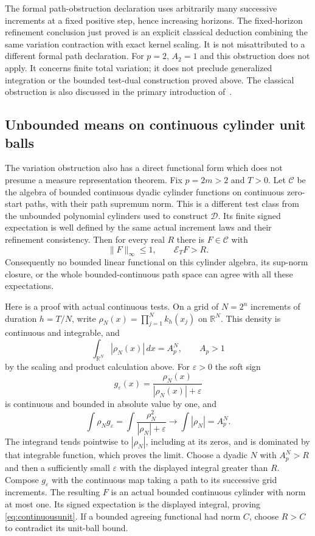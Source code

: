 \documentclass[11pt]{article}
\theoremstyle{remark}\newtheorem{remark}[theorem]{Remark}
\newcommand{\R}{\mathbb R}\newcommand{\N}{\mathbb N}
\newcommand{\D}{\mathcal D}\newcommand{\E}{\mathcal E}
\begin{document}
The formal path-obstruction declaration uses arbitrarily many
successive increments at a fixed positive step, hence increasing
horizons. The fixed-horizon refinement conclusion just proved is
an explicit classical deduction combining the same variation
contraction with exact kernel scaling. It is not misattributed to
a different formal path declaration. For $p=2$, $A_2=1$ and this
obstruction does not apply. It concerns finite total variation;
it does not preclude generalized integration or the bounded
test-dual construction proved above. The classical obstruction is
also discussed in the primary introduction of~\cite{bcm}.

\subsection{Unbounded means on continuous cylinder unit balls}
The variation obstruction also has a direct functional form which does
not presume a measure representation theorem. Fix $p=2m>2$ and $T>0$.
Let $\mathcal C$ be the algebra of bounded continuous dyadic cylinder
functions on continuous zero-start paths, with their path supremum
norm. This is a different test class from the unbounded polynomial
cylinders used to construct $\D$. Its finite signed expectation is
well defined by the same actual increment laws and their refinement
consistency. Then for every real $R$ there is $F\in\mathcal C$ with
\begin{equation}\label{eq:continuousunit}
 \|F\|_\infty\leq1,\qquad \E_TF>R.
\end{equation}
Consequently no bounded linear functional on this cylinder algebra,
its sup-norm closure, or the whole bounded-continuous path space can
agree with all these expectations.

Here is a proof with actual continuous tests. On a grid of $N=2^n$
increments of duration $h=T/N$, write
$\rho_N(x)=\prod_{j=1}^Nk_h(x_j)$ on $\R^N$.
This density is continuous and integrable, and
\[
 \int_{\R^N}|\rho_N(x)|\,dx=A_p^N,
 \qquad A_p>1
\]
by the scaling and product calculation above. For $\varepsilon>0$
the soft sign
\[
 g_\varepsilon(x)=
       \frac{\rho_N(x)}{|\rho_N(x)|+\varepsilon}
\]
is continuous and bounded in absolute value by one, and
\[
 \int\rho_Ng_\varepsilon
   =\int\frac{\rho_N^2}{|\rho_N|+\varepsilon}
       \longrightarrow\int|\rho_N|=A_p^N.
\]
The integrand tends pointwise to $|\rho_N|$, including at its zeros,
and is dominated by that integrable function, which proves the limit.
Choose a dyadic $N$ with $A_p^N>R$ and then a sufficiently small
$\varepsilon$ with the displayed integral greater than $R$.
Compose $g_\varepsilon$ with the continuous map taking a path to
its successive grid increments. The resulting $F$ is an actual
bounded continuous cylinder with norm at most one. Its signed
expectation is the displayed integral, proving
\eqref{eq:continuousunit}. If a bounded agreeing functional had norm
$C$, choose $R>C$ to contradict its unit-ball bound.
\end{document}
